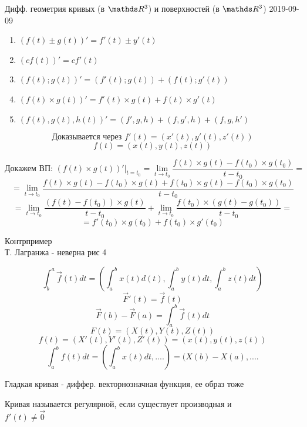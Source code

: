 \documentclass[main]{subfiles}
\begin{document}
\begin{lect}{Дифф. геометрия кривых (в $\R^3$) и поверхностей (в $\R^3$) 2019-09-09}
    \begin{theorem} [свойства]
    		\begin{enumerate}
    			\item $(f(t) \pm g(t))' = f'(t) \pm y'(t)$
    			\item $(c f(t))' = cf'(t)$
    			\item $(f(t); g(t))' = (f'(t); g(t)) + (f(t); g'(t))$
    			\item $(f(t) \times g(t))' = f'(t) \times g(t) + f(t) \times g'(t)$
    			\item $(f(t), g(t), h(t))' = (f', g, h) + (f, g', h) + (f, g, h')$
    		\end{enumerate}

    		\[\text{Доказывается через }f'(t) = (x'(t), y'(t), z'(t))\]
    		\[f(t) = (x(t), y(t), z(t))\]

    		\[\text{Докажем ВП: }(f(t) \times g(t))'|_{t = t_0} = \lim_{t \to t_0} \frac{f(t) \times g(t) - f(t_0) \times g(t_0)}{t - t_0} = \]
    		\[= \lim_{t \to t_0} \frac{f(t) \times g(t) - f(t_0) \times g(t) + f(t_0) \times g(t) - f(t_0) \times g(t_0)}{t - t_0}\]
    		\[= \lim_{t \to t_0} \frac{(f(t) - f(t_0)) \times g(t)}{t - t_0} +
    		\lim_{t \to t_0} \frac{f(t_0) \times (g(t) - g(t_0))}{t - t_0} = \]
    		\[= f'(t_0) \times g(t_0) + f(t_0) \times g'(t_0)\]
    \end{theorem}

    \begin{example}
    		Контрпример\\
    		Т. Лагранжа  - неверна рис 4
    \end{example}

    \[\int_b^a \overrightarrow{f}(t) dt = (\int_a^b x(t)d(t), \int_a^b y(t)dt, \int_a^b z(t)dt) \]
    \[\overrightarrow{F}'(t) = \overrightarrow{f}(t)\]
    \[\overrightarrow{F}(b) - \overrightarrow{F}(a) = \int_a^b \overrightarrow{f}(t)dt\]
    \[F(t) = (X(t), Y(t), Z(t))\]
    \[f(t) = (X'(t), Y'(t), Z'(t)) = (x(t), y(t), z(t))\]
    \[\int_a^b f(t)dt = (\int_a^b x(t) dt, ....) = (X(b) - X(a), ....\]

    \begin{definition}
        Гладкая кривая - диффер. векторнозначная функция, ее образ тоже
    \end{definition}

    \begin{definition}
        Кривая называется регулярной, если существует производная и\\
    	$f'(t) \neq \overrightarrow{0}$
    \end{definition}


\end{lect}
\end{document}
